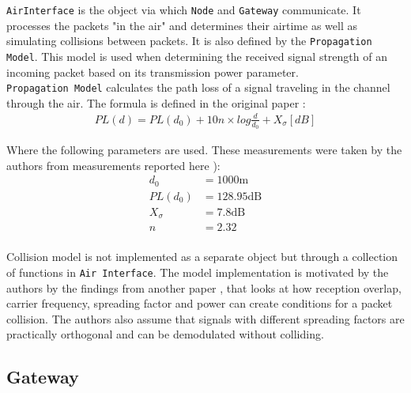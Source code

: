 \texttt{AirInterface} is the object via which \texttt{Node} and \texttt{Gateway} communicate. It processes the packets "in the air" and determines their airtime as well as simulating collisions between packets. It is also defined by the \texttt{Propagation Model}.
This model is used when determining the received signal
strength of an incoming packet based on its transmission power parameter. \\

\texttt{Propagation Model} calculates the path loss 
of a signal traveling in the channel through the air.
The formula is defined in the original paper \cite{simulator} :
\begin{align}
    PL(d) = PL(d_0) + 10n\times log\frac{d}{d_0} + X_{\sigma} [dB] \label{eq:propagation_model}
\end{align}

Where the following parameters are used. These measurements were taken by the authors \cite{simulator} from measurements reported here \cite{propagation_model_parameters}):
\begin{align*}
     d_0 & = 1000 \text{m}\\
     PL(d_0) & = 128.95 \text{dB}\\
     X_{\sigma} & = 7.8 \text{dB}\\
     n & = 2.32\\
\end{align*}

Collision model is not implemented as a separate object but through a collection of functions in \texttt{Air Interface}. The model implementation is motivated by the authors \cite{simulator} by the findings from another paper \cite{collision_conditions}, that looks at how reception overlap, carrier frequency, spreading factor and power can create conditions for a packet collision. The authors \cite{simulator} also assume that signals with different spreading factors are practically orthogonal and can be demodulated without colliding.\\


\subsection{Gateway}

